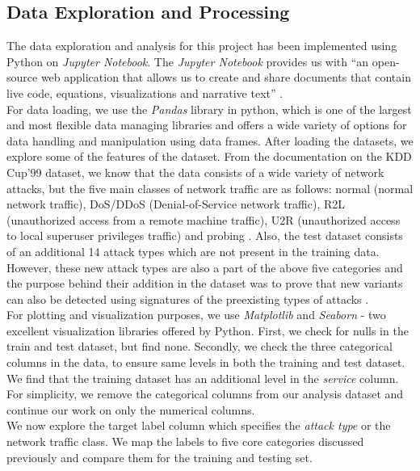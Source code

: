 \subsection{Data Exploration and Processing}
The data exploration and analysis for this project has been implemented using Python on {\em Jupyter Notebook}. The {\em Jupyter Notebook} provides us with ``an open-source web application that allows us to create and share documents that contain live code, equations, visualizations and narrative text'' \cite{jup08}.\\
For data loading, we use the {\em Pandas} library in python, which is one of the largest and most flexible data managing libraries and offers a wide variety of options for data handling and manipulation using data frames. After loading the datasets, we explore some of the features of the dataset. From the documentation on the KDD Cup'99 dataset, we know that the data consists of a wide variety of network attacks, but the five main classes of network traffic are as follows: normal (normal network traffic), DoS/DDoS (Denial-of-Service network traffic), R2L (unauthorized access from a remote machine traffic), U2R (unauthorized access to local superuser privileges traffic) and probing \cite{kdd06}. Also, the test dataset consists of an additional 14 attack types which are not present in the training data. However, these new attack types are also a part of the above five categories and the purpose behind their addition in the dataset was to prove that new variants can also be detected using signatures of the preexisting types of attacks \cite{kdd06}.\\
For plotting and visualization purposes, we use {\em Matplotlib} and {\em Seaborn} - two excellent visualization libraries offered by Python. First, we check for nulls in the train and test dataset, but find none. Secondly, we check the three categorical columns in the data, to ensure same levels in both the training and test dataset. We find that the training dataset has an additional level in the {\em service} column. For simplicity, we remove the categorical columns from our analysis dataset and continue our work on only the numerical columns.\\
We now explore the target label column which specifies the {\em attack type} or the network traffic class. We map the labels to five core categories discussed previously and compare them for the training and testing set.
